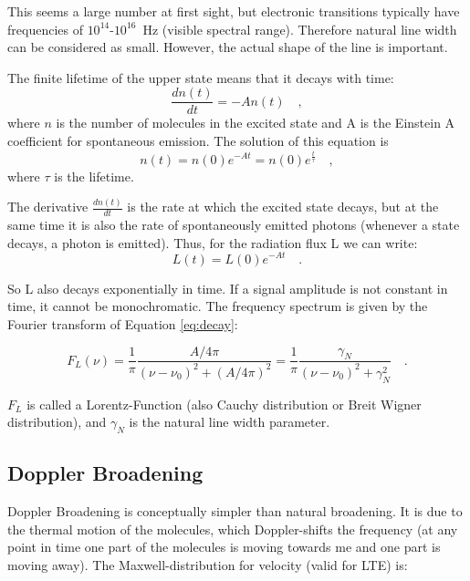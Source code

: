 This seems a large number at first sight, but electronic transitions
typically have frequencies of $10^{14}$-$10^{16}$~Hz (visible spectral
range). Therefore natural line width can be considered as
small. However, the actual shape of the line is important.

The finite lifetime of the upper state means that it decays with time:
\begin{equation}
\frac{dn(t)}{dt} = -A n(t) \quad ,
\end{equation}
where $n$ is the number of molecules in the excited state and A is the
Einstein A coefficient for spontaneous emission. The solution of this
equation is
\begin{equation}
n(t) = n(0) e^{-At} = n(0) e^{\frac{t}{\tau}} \quad ,
\end{equation}
where $\tau$ is the lifetime. 

The derivative $\frac{dn(t)}{dt}$ is the rate at which
the excited state decays, but at the same time it is also the rate of
spontaneously emitted photons (whenever a state decays, a photon is
emitted). Thus, for the radiation flux L we can write:
\begin{equation}
\label{eq:decay}
L(t) = L(0) e^{-At} \quad .
\end{equation}

So L also decays exponentially in time. If a signal amplitude is not
constant in time, it cannot be monochromatic. The frequency spectrum
is given by the Fourier transform of Equation \ref{eq:decay}:

\begin{equation}
F_{L}(\nu) = \frac{1}{\pi} \frac{A/4\pi}{(\nu - \nu_{0})^{2} +
  (A/4\pi)^{2}} = \frac{1}{\pi} \frac{\gamma_{N}}{(\nu - \nu_{0})^{2}
  + \gamma_{N}^{2}} \quad .
\end{equation}

$F_{L}$ is called a Lorentz-Function (also Cauchy distribution or
Breit Wigner distribution), and $\gamma_{N}$ is the natural line width parameter. 

\subsection{Doppler Broadening}

Doppler Broadening is conceptually simpler than natural broadening. It
is due to the thermal motion of the molecules, which Doppler-shifts
the frequency (at any point in time one part of the molecules is
moving towards me and one part is moving away). The
Maxwell-distribution for velocity (valid for LTE) is:

